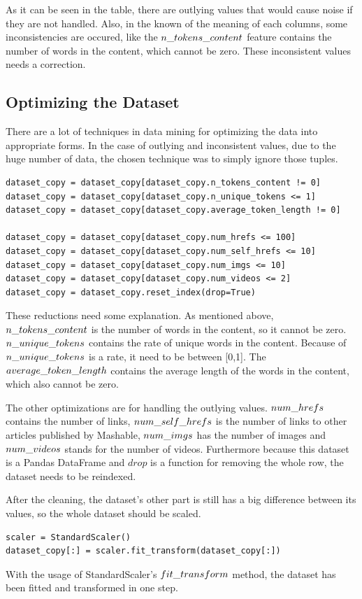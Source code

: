 \noindent As it can be seen in the table, there are outlying values that would cause noise if they are not handled. Also, in the known of the meaning of each columns, some inconsistencies are occured, like the $n\char`_tokens\char`_content$ feature contains the number of words in the content, which cannot be zero. These inconsistent values needs a correction.


\subsection{Optimizing the Dataset}

There are a lot of techniques in data mining for optimizing the data into appropriate forms. In the case of outlying and inconsistent values, due to the huge number of data, the chosen technique was to simply ignore those tuples. 
\begin{lstlisting}
dataset_copy = dataset_copy[dataset_copy.n_tokens_content != 0]
dataset_copy = dataset_copy[dataset_copy.n_unique_tokens <= 1]
dataset_copy = dataset_copy[dataset_copy.average_token_length != 0]

dataset_copy = dataset_copy[dataset_copy.num_hrefs <= 100]
dataset_copy = dataset_copy[dataset_copy.num_self_hrefs <= 10]
dataset_copy = dataset_copy[dataset_copy.num_imgs <= 10]
dataset_copy = dataset_copy[dataset_copy.num_videos <= 2]
dataset_copy = dataset_copy.reset_index(drop=True)
\end{lstlisting}

These reductions need some explanation. As mentioned above, $n\char`_tokens\char`_content$ is the number of words in the content, so it cannot be zero. $n\char`_unique\char`_tokens$ contains the rate of unique words in the content. Because of $n\char`_unique\char`_tokens$ is a rate, it need to be between [0,1]. The $average\char`_token\char`_length$ contains the average length of the words in the content, which also cannot be zero. \smallskip

The other optimizations are for handling the outlying values. $num\char`_hrefs$ contains the number of links, $num\char`_self\char`_hrefs$ is the number of links to other articles published by Mashable, $num\char`_imgs$ has the number of images and $num\char`_videos$ stands for the number of videos. Furthermore because this dataset is a Pandas DataFrame and $drop$ is a function for removing the whole row, the dataset needs to be reindexed.\medskip

After the cleaning, the dataset's other part is still has a big difference between its values, so the whole dataset should be scaled. 
\begin{lstlisting}
scaler = StandardScaler()
dataset_copy[:] = scaler.fit_transform(dataset_copy[:])
\end{lstlisting}
With the usage of StandardScaler's $fit\char`_transform$ method, the dataset has been fitted and transformed in one step. \medskip

